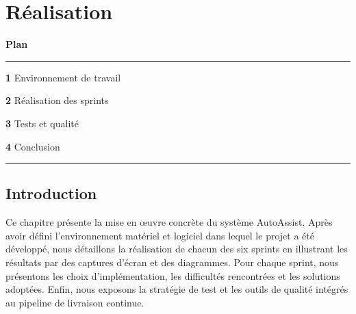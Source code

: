 \chapter{R\'{e}alisation}
\label{chap:realisation}

\vspace{2cm}

\noindent\textbf{\Large Plan}

\vspace{0.5cm}
\noindent\rule{\textwidth}{0.4pt}
\vspace{0.3cm}

\begin{list}{}{\setlength{\leftmargin}{1.5cm}\setlength{\itemsep}{6pt}}
  \item \textbf{1} \hspace{0.3cm} Environnement de travail \dotfill \pageref{sec:env}
  \item \textbf{2} \hspace{0.3cm} R\'{e}alisation des sprints \dotfill \pageref{sec:sprints}
  \item \textbf{3} \hspace{0.3cm} Tests et qualit\'{e} \dotfill \pageref{sec:tests}
  \item \textbf{4} \hspace{0.3cm} Conclusion \dotfill \pageref{sec:concl3}
\end{list}

\vspace{0.3cm}
\noindent\rule{\textwidth}{0.4pt}

\newpage

\section*{Introduction}

Ce chapitre pr\'{e}sente la mise en \oe uvre concr\`{e}te du syst\`{e}me AutoAssist. Apr\`{e}s avoir d\'{e}fini l'environnement mat\'{e}riel et logiciel dans lequel le projet a \'{e}t\'{e} d\'{e}velopp\'{e}, nous d\'{e}taillons la r\'{e}alisation de chacun des six sprints en illustrant les r\'{e}sultats par des captures d'\'{e}cran et des diagrammes. Pour chaque sprint, nous pr\'{e}sentons les choix d'impl\'{e}mentation, les difficult\'{e}s rencontr\'{e}es et les solutions adopt\'{e}es. Enfin, nous exposons la strat\'{e}gie de test et les outils de qualit\'{e} int\'{e}gr\'{e}s au pipeline de livraison continue.


